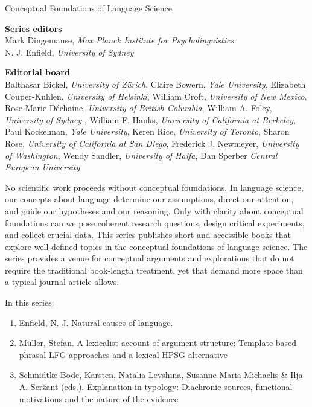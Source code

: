 {\large Conceptual Foundations of Language Science}

\bigskip

\textbf{Series editors}\\
Mark Dingemanse, \textit{Max Planck Institute for Psycholinguistics}   \\
N. J. Enfield, \textit{University of Sydney}


\bigskip


\textbf{Editorial board}\\
Balthasar Bickel, \textit{University of Zürich},
Claire Bowern, \textit{Yale University},
Elizabeth Couper-Kuhlen, \textit{University of Helsinki},
William Croft, \textit{University of New Mexico},
Rose-Marie Déchaine, \textit{University of British Columbia},
William A. Foley, \textit{University of Sydney} ,
William F. Hanks, \textit{University of California at Berkeley},
Paul Kockelman, \textit{Yale University},
Keren Rice, \textit{University of Toronto},
Sharon Rose, \textit{University of California at San Diego},
Frederick J. Newmeyer, \textit{University of Washington},
Wendy Sandler, \textit{University of Haifa},
Dan Sperber \textit{Central European University}

 
\bigskip

\begin{minipage}{\textwidth}%

No scientific work proceeds without conceptual foundations. In language science, our concepts about language determine our assumptions, direct our attention, and guide our hypotheses and our reasoning. Only with clarity about conceptual foundations can we pose coherent research questions, design critical experiments, and collect crucial data.
%
This series publishes short and accessible books that explore well-defined topics in the conceptual foundations of language science. The series provides a venue for conceptual arguments and explorations that do not require the traditional book-length treatment, yet that demand more space than a typical journal article allows.
\end{minipage}

\bigskip
\bigskip

In this series:

\begin{enumerate}
\item Enfield, N. J. {Natural causes of language}.
\item Müller, Stefan. {A lexicalist account of argument structure: Template-based phrasal LFG approaches and a lexical HPSG alternative}
\item Schmidtke-Bode, Karsten,  Natalia Levshina, Susanne Maria Michaelis \& Ilja A. Seržant (eds.).  Explanation in typology: Diachronic sources, functional motivations and the nature of the evidence 
\end{enumerate}
